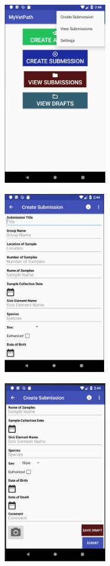 \documentclass[onecolumn, draftclsnofoot,10pt, compsoc]{IEEEtran}
\begin{document}
\begin{center}
\includegraphics[height=8cm]{toolbar.png}
\end{center}

\begin{center}
\includegraphics[height=8cm]{create_subs.png}
\end{center}

\begin{center}
\includegraphics[height=8cm]{create_subs_pt2.png}
\end{center}
\end{document}
